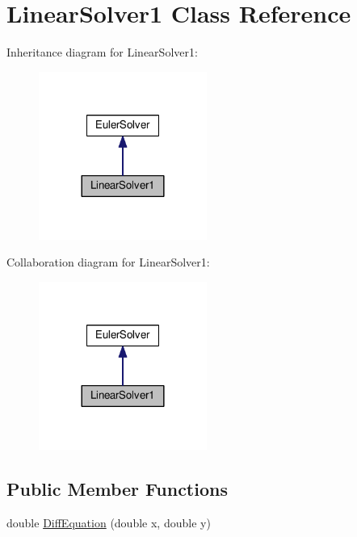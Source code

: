 \hypertarget{classLinearSolver1}{}\section{Linear\+Solver1 Class Reference}
\label{classLinearSolver1}


Inheritance diagram for Linear\+Solver1\+:\nopagebreak
\begin{figure}[H]
\begin{center}
\leavevmode
\includegraphics[width=156pt]{classLinearSolver1__inherit__graph}
\end{center}
\end{figure}


Collaboration diagram for Linear\+Solver1\+:\nopagebreak
\begin{figure}[H]
\begin{center}
\leavevmode
\includegraphics[width=156pt]{classLinearSolver1__coll__graph}
\end{center}
\end{figure}
\subsection*{Public Member Functions}
\begin{DoxyCompactItemize}
\item 
double \hyperlink{classLinearSolver1_a9c05572054b1ab7f8974a7bb370a3f21}{Diff\+Equation} (double x, double y)
\end{DoxyCompactItemize}
